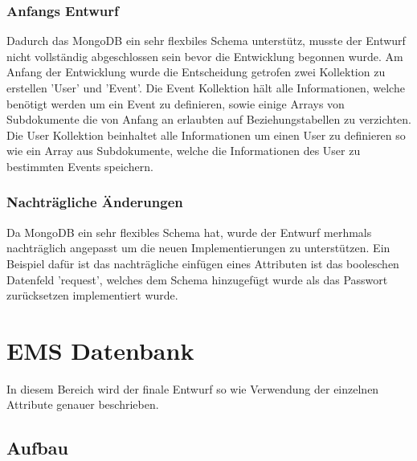 			\subsubsection{Anfangs Entwurf}
				Dadurch das MongoDB ein sehr flexbiles Schema unterstütz, musste der Entwurf nicht vollständig abgeschlossen sein bevor die Entwicklung begonnen wurde.
				Am Anfang der Entwicklung wurde die Entscheidung getrofen zwei Kollektion zu erstellen 'User' und 'Event'.
				Die Event Kollektion hält alle Informationen, welche benötigt werden um ein Event zu definieren, sowie einige Arrays von Subdokumente die von Anfang an erlaubten auf Beziehungstabellen zu verzichten.
				Die User Kollektion beinhaltet alle Informationen um einen User zu definieren so wie ein Array aus Subdokumente, welche die Informationen des User zu bestimmten Events speichern. 
			\subsubsection{Nachträgliche Änderungen}
				Da MongoDB ein sehr flexibles Schema hat, wurde der Entwurf merhmals nachträglich angepasst um die neuen Implementierungen zu unterstützen. 
				Ein Beispiel dafür ist das nachträgliche einfügen eines Attributen ist das booleschen Datenfeld 'request', welches dem Schema hinzugefügt wurde als das Passwort zurücksetzen implementiert wurde.			
			\newpage
	\section{EMS Datenbank}
		In diesem Bereich wird der finale Entwurf so wie Verwendung der einzelnen Attribute genauer beschrieben.	
		\subsection{Aufbau}
